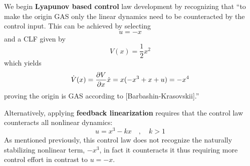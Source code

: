 \documentclass[12pt]{ucthesis}
\begin{document}
\begin{eg}
	We begin \textbf{Lyapunov based control} law development by recognizing that ``to make the origin GAS only the linear dynamics need to be counteracted by the control input. This can be achieved by selecting
		\begin{equation} \label{eq: bs_ex_u}
			u = -x
		\end{equation}
	and a CLF given by 
		\begin{equation} \label{eq: bs_ex_V}
			V(x) = \frac{1}{2}x^2
		\end{equation}
	which yields
		\begin{equation} \label{eq: bs_ex_Vdot}
			\dot{V}(x) = \frac{\partial V}{\partial x}\dot{x} = x(-x^3+x+u) = -x^4
		\end{equation}
	proving the origin is GAS according to [Barbashin-Krasovskii].''
	
	Alternatively, applying \textbf{feedback linearization} requires that the control law counteracts all nonlinear dynamics:
		\begin{equation} \label{eq: fb_ex_u}
			u = x^3 - kx \quad,\quad k>1
		\end{equation}
	As mentioned previously, this control law does not recognize the naturally stabilizing nonlinear term, $-x^3$, in fact it counteracts it thus requiring more control effort in contrast to $u=-x$.
\end{eg}
\end{document}
